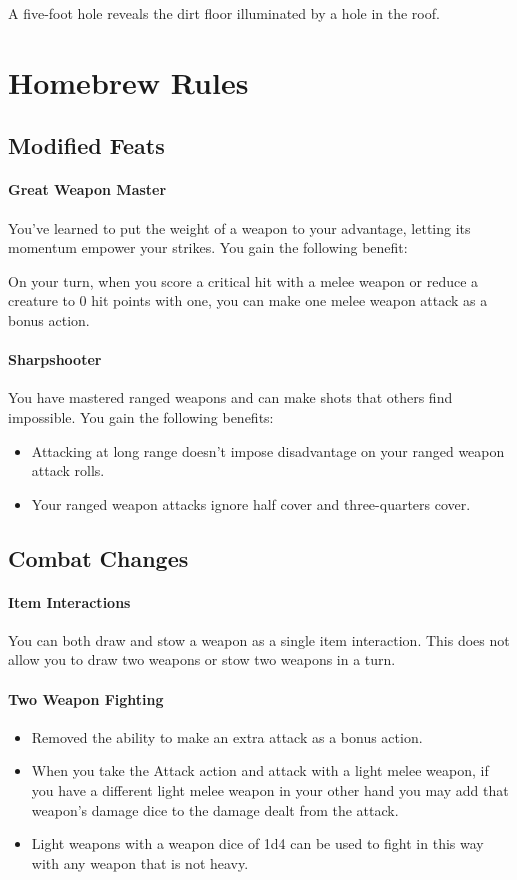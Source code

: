 \documentclass[10pt,twoside,twocolumn,nomultitoc,openany,nodeprecatedcode]{dndbook}
\begin{document}
	A five-foot hole reveals the dirt floor illuminated by a hole in the roof.

	\part{Homebrew Rules}
	\chapter{Modified Feats}
	\vspace{1em}
	\subsection{Great Weapon Master}
	You've learned to put the weight of a weapon to your advantage, letting its momentum empower your strikes. You gain the following benefit:
	
	On your turn, when you score a critical hit with a melee weapon or reduce a creature to 0 hit points with one, you can make one melee weapon attack as a bonus action.
	
	\subsection{Sharpshooter}
	You have mastered ranged weapons and can make shots that others find impossible. You gain the following benefits: 
	
	\begin{itemize}
		\item Attacking at long range doesn't impose disadvantage on your ranged weapon attack rolls. 
		\item Your ranged weapon attacks ignore half cover and three-quarters cover.
	\end{itemize}

	\chapter{Combat Changes}
	\vspace{1em}
	\subsection{Item Interactions}
	You can both draw and stow a weapon as a single item interaction. This does not allow you to draw two weapons or stow two weapons in a turn. 
	
	\subsection{Two Weapon Fighting}
	\begin{itemize}
		\item Removed the ability to make an extra attack as a bonus action.
		\item When you take the Attack action and attack with a light melee weapon, if you have a different light melee weapon in your other hand you may add that weapon’s damage dice to the damage dealt from the attack.
		\item Light weapons with a weapon dice of 1d4 can be used to fight in this way with any weapon that is not heavy.
	\end{itemize}
\end{document}
